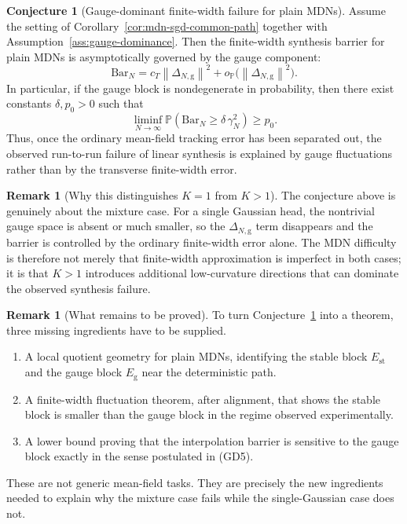 \documentclass[11pt]{article}
\theoremstyle{definition}
\newtheorem{remark}[theorem]{Remark}
\newtheorem{conjecture}[theorem]{Conjecture}
\newcommand{\Prob}{\mathbb{P}}
\newcommand{\norm}[1]{\left\lVert #1 \right\rVert}
\begin{document}
\begin{conjecture}[Gauge-dominant finite-width failure for plain MDNs]
\label{conj:gauge-dominance}
Assume the setting of Corollary~\ref{cor:mdn-sgd-common-path} together with
Assumption~\ref{ass:gauge-dominance}. Then the finite-width synthesis barrier
for plain MDNs is asymptotically governed by the gauge component:
\[
  \mathrm{Bar}_N
  =
  c_T \norm{\Delta_{N,\mathrm{g}}}^2
  +
  o_{\Prob}\!\big(\norm{\Delta_{N,\mathrm{g}}}^2\big).
\]
In particular, if the gauge block is nondegenerate in probability, then there
exist constants $\delta,p_0>0$ such that
\[
  \liminf_{N\to\infty}
  \Prob\!\left(
    \mathrm{Bar}_N \ge \delta\,\gamma_N^2
  \right)
  \ge
  p_0.
\]
Thus, once the ordinary mean-field tracking error has been separated out, the
observed run-to-run failure of linear synthesis is explained by gauge
fluctuations rather than by the transverse finite-width error.
\end{conjecture}

\begin{remark}[Why this distinguishes $K=1$ from $K>1$]
The conjecture above is genuinely about the mixture case. For a single Gaussian
head, the nontrivial gauge space is absent or much smaller, so the
$\Delta_{N,\mathrm{g}}$ term disappears and the barrier is controlled by the
ordinary finite-width error alone. The MDN difficulty is therefore not merely
that finite-width approximation is imperfect in both cases; it is that
$K>1$ introduces additional low-curvature directions that can dominate the
observed synthesis failure.
\end{remark}

\begin{remark}[What remains to be proved]
To turn Conjecture~\ref{conj:gauge-dominance} into a theorem, three missing
ingredients have to be supplied.
\begin{enumerate}[label=(\alph*)]
  \item A local quotient geometry for plain MDNs, identifying the stable block
  $E_{\mathrm{st}}$ and the gauge block $E_{\mathrm{g}}$ near the deterministic
  path.
  \item A finite-width fluctuation theorem, after alignment, that shows the
  stable block is smaller than the gauge block in the regime observed
  experimentally.
  \item A lower bound proving that the interpolation barrier is sensitive to the
  gauge block exactly in the sense postulated in (GD5).
\end{enumerate}
These are not generic mean-field tasks. They are precisely the new ingredients
needed to explain why the mixture case fails while the single-Gaussian case does
not.
\end{remark}
\end{document}
